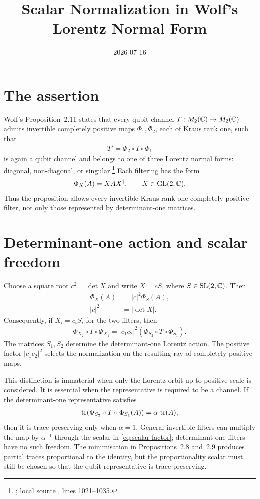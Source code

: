\documentclass{article}
\title{Scalar Normalization in Wolf's Lorentz Normal Form}
\author{}
\date{2026-07-16}
\begin{document}
\maketitle
{}

\section{The assertion}

Wolf's Proposition~2.11 states that every qubit channel
$T:M_{2}(\mathbb{C})\to M_{2}(\mathbb{C})$ admits invertible completely positive maps
$\Phi_1,\Phi_2$, each of Kraus rank one, such that
\begin{align}
  T' = \Phi_2\circ T\circ\Phi_1
\end{align}
is again a qubit channel and belongs to one of three Lorentz normal forms:
diagonal, non-diagonal, or singular.\footnote{\cite[Proposition~2.11]{Wolf2012Quantum};
local source ,
lines 1021--1035.}  Each filtering has the form
\begin{align}
  \Phi_X(A)=XAX^\dagger,
  \qquad X\in\mathrm{GL}(2,\mathbb{C}).
\end{align}
Thus the proposition allows every invertible Kraus-rank-one completely positive
filter, not only those represented by determinant-one matrices.

\section{Determinant-one action and scalar freedom}

Choose a square root $c^2=\det X$ and write $X=cS$, where
$S\in\mathrm{SL}(2,\mathbb{C})$. Then
\begin{align}
  \Phi_X(A)
    &= |c|^2\Phi_S(A),\\
  |c|^2
    &= |\det X|.
\end{align}
Consequently, if $X_i=c_iS_i$ for the two filters, then
\begin{align}
  \Phi_{X_2}\circ T\circ\Phi_{X_1}
  = |c_1c_2|^2
    (\Phi_{S_2}\circ T\circ\Phi_{S_1}).
  \label{eq:scalar-factor}
\end{align}
The matrices $S_1,S_2$ determine the determinant-one Lorentz action. The
positive factor $|c_1c_2|^2$ selects the normalization on the resulting ray of
completely positive maps.

This distinction is immaterial when only the Lorentz orbit up to positive scale
is considered. It is essential when the representative is required to be a
channel. If the determinant-one representative satisfies
\begin{align}
  \operatorname{tr}\!\left(\Phi_{S_2}\circ T\circ\Phi_{S_1}(A)\right)
  = \alpha\,\operatorname{tr}(A),
\end{align}
then it is trace preserving only when $\alpha=1$. General invertible filters
can multiply the map by $\alpha^{-1}$ through the scalar in
\eqref{eq:scalar-factor}; determinant-one filters have no such freedom. The
minimisation in Propositions~2.8 and~2.9 produces partial traces proportional to
the identity, but the proportionality scalar must still be chosen so that the
qubit representative is trace preserving.
\end{document}
